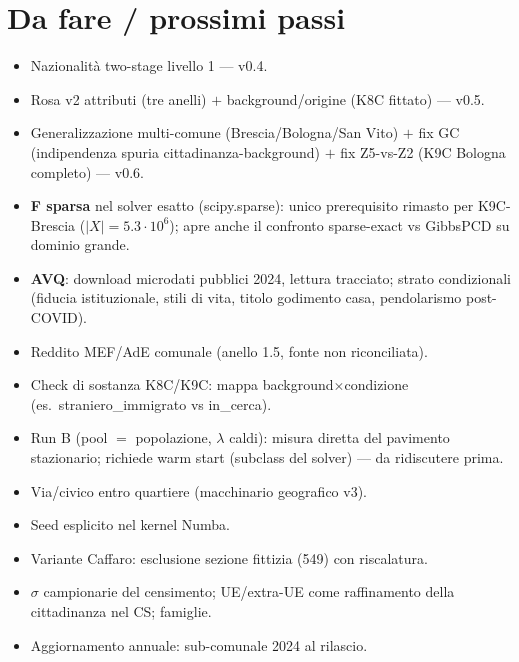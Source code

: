 \documentclass[11pt,a4paper]{article}
\begin{document}
\section{Da fare / prossimi passi}
\label{sec:todo}
\begin{itemize}[leftmargin=*,itemsep=1pt]
  \item[$\boxtimes$] Nazionalit\`a two-stage livello 1 --- v0.4.
  \item[$\boxtimes$] Rosa v2 attributi (tre anelli) $+$ background/origine
  (K8C fittato) --- v0.5.
  \item[$\boxtimes$] Generalizzazione multi-comune (Brescia/Bologna/San
  Vito) $+$ fix GC (indipendenza spuria cittadinanza-background) $+$ fix
  Z5-vs-Z2 (K9C Bologna completo) --- v0.6.
  \item[$\square$] \textbf{F sparsa} nel solver esatto (scipy.sparse):
  unico prerequisito rimasto per K9C-Brescia ($|X|=5.3\cdot10^6$); apre
  anche il confronto sparse-exact vs GibbsPCD su dominio grande.
  \item[$\square$] \textbf{AVQ}: download microdati pubblici 2024, lettura
  tracciato; strato condizionali (fiducia istituzionale, stili di vita,
  titolo godimento casa, pendolarismo post-COVID).
  \item[$\square$] Reddito MEF/AdE comunale (anello 1.5, fonte non
  riconciliata).
  \item[$\square$] Check di sostanza K8C/K9C: mappa
  background$\times$condizione (es.\ straniero\_immigrato vs in\_cerca).
  \item[$\square$] Run B (pool $=$ popolazione, $\lambda$ caldi): misura
  diretta del pavimento stazionario; richiede warm start (subclass del
  solver) --- da ridiscutere prima.
  \item[$\square$] Via/civico entro quartiere (macchinario geografico v3).
  \item[$\square$] Seed esplicito nel kernel Numba.
  \item[$\square$] Variante Caffaro: esclusione sezione fittizia (549) con
  riscalatura.
  \item[$\square$] $\sigma$ campionarie del censimento; UE/extra-UE come
  raffinamento della cittadinanza nel CS; famiglie.
  \item[$\square$] Aggiornamento annuale: sub-comunale 2024 al rilascio.
\end{itemize}
\end{document}

